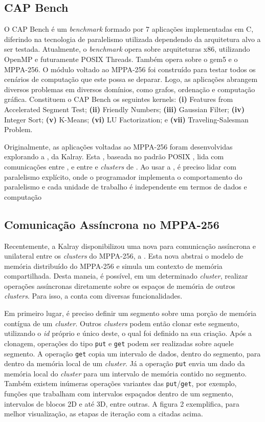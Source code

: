 \documentclass[a4paper,11pt]{article}
\newcommand{\mppa}{MPPA-256\xspace}
\newcommand{\capb}{CAP Bench\xspace}
\begin{document}
\subsection{\capb}
\label{subsec:capb}

O \capb é um \textit{benchmark} formado por 7 aplicações implementadas em C, diferindo na tecnologia de paralelismo utilizada dependendo da arquitetura alvo a ser testada. Atualmente, o \textit{benchmark} opera sobre arquiteturas x86, utilizando OpenMP e futuramente POSIX Threads. Também opera sobre o gem5 e o \mppa. O módulo voltado ao \mppa foi construído para testar todos os cenários de computação que este possa se deparar. Logo, as aplicações abrangem diversos problemas em diversos domínios, como grafos, ordenação e computação gráfica. Constituem o \capb os seguintes kernels: \textbf{(i)} Features from Accelerated Segment Test; \textbf{(ii)} Friendly Numbers; \textbf{(iii)} Gaussian Filter; \textbf{(iv)} Integer Sort; \textbf{(v)} K-Means; \textbf{(vi)} LU Factorization; e \textbf{(vii)} Traveling-Salesman Problem.

Originalmente, as aplicações voltadas ao \mppa foram desenvolvidas explorando a \api \ipc, da Kalray. Esta \api, baseada no padrão POSIX \ipc, lida com comunicações entre \ccs, e entre \ccs e \textit{clusters} de \io. Ao usar a \ipc, é preciso lidar com paralelismo explícito, onde o programador implementa o comportamento do paralelismo e cada unidade de trabalho é independente em termos de dados e computação \cite{Castro-Souza-CCPE:2016}


\subsection{Comunicação Assíncrona no \mppa}
\label{subsec:async}

Recentemente, a Kalray disponibilizou uma nova \api para comunicação assíncrona e unilateral entre os \textit{clusters} do \mppa, a \async. Esta nova \api abstrai o modelo de memória distribuído do \mppa e simula um contexto de memória compartilhada. Desta maneia, é possível, em um determinado \textit{cluster}, realizar operações assíncronas diretamente sobre os espaços de memória de outros \textit{clusters}. Para isso, a \api conta com diversas funcionalidades.

Em primeiro lugar, é preciso definir um segmento sobre uma porção de memória contígua de um \textit{cluster}. Outros \textit{clusters} podem então clonar este segmento, utilizando o \textit{id} próprio e único deste, o qual foi definido na sua criação. Após a clonagem, operações do tipo \texttt{put} e \texttt{get} podem ser realizadas sobre aquele segmento. A operação \texttt{get} copia um intervalo de dados, dentro do segmento, para dentro da memória local de um \textit{cluster}. Já a operação \texttt{put} envia um dado da memória local do \textit{cluster} para um intervalo de memória contido no segmento. Também existem inúmeras operações variantes das \texttt{put}/\texttt{get}, por exemplo, funções que trabalham com intervalos espaçados dentro de um segmento, intervalos de blocos 2D e até 3D, entre outras. A figura 2 exemplifica, para melhor visualização, as etapas de iteração com a \api \async citadas acima.
\end{document}
